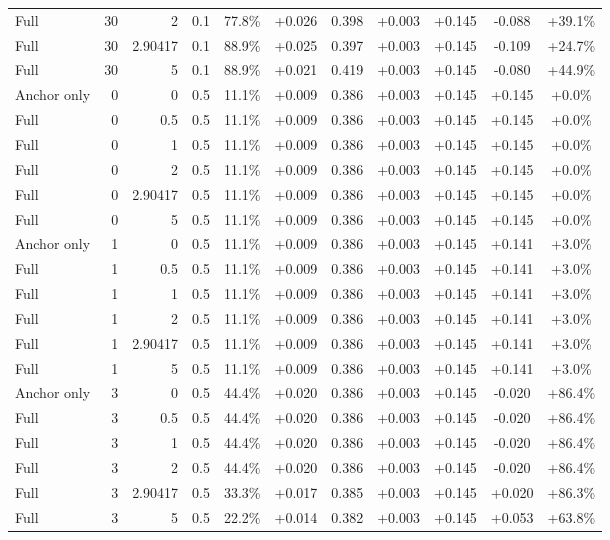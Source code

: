 \begin{table}[htbp]
\begin{tabular}{lrrrccccccc}
Full & 30 & 2 & 0.1 & 77.8\% & +0.026 & 0.398 & +0.003 & +0.145 & -0.088 & +39.1\% \\
Full & 30 & 2.90417 & 0.1 & 88.9\% & +0.025 & 0.397 & +0.003 & +0.145 & -0.109 & +24.7\% \\
Full & 30 & 5 & 0.1 & 88.9\% & +0.021 & 0.419 & +0.003 & +0.145 & -0.080 & +44.9\% \\
Anchor only & 0 & 0 & 0.5 & 11.1\% & +0.009 & 0.386 & +0.003 & +0.145 & +0.145 & +0.0\% \\
Full & 0 & 0.5 & 0.5 & 11.1\% & +0.009 & 0.386 & +0.003 & +0.145 & +0.145 & +0.0\% \\
Full & 0 & 1 & 0.5 & 11.1\% & +0.009 & 0.386 & +0.003 & +0.145 & +0.145 & +0.0\% \\
Full & 0 & 2 & 0.5 & 11.1\% & +0.009 & 0.386 & +0.003 & +0.145 & +0.145 & +0.0\% \\
Full & 0 & 2.90417 & 0.5 & 11.1\% & +0.009 & 0.386 & +0.003 & +0.145 & +0.145 & +0.0\% \\
Full & 0 & 5 & 0.5 & 11.1\% & +0.009 & 0.386 & +0.003 & +0.145 & +0.145 & +0.0\% \\
Anchor only & 1 & 0 & 0.5 & 11.1\% & +0.009 & 0.386 & +0.003 & +0.145 & +0.141 & +3.0\% \\
Full & 1 & 0.5 & 0.5 & 11.1\% & +0.009 & 0.386 & +0.003 & +0.145 & +0.141 & +3.0\% \\
Full & 1 & 1 & 0.5 & 11.1\% & +0.009 & 0.386 & +0.003 & +0.145 & +0.141 & +3.0\% \\
Full & 1 & 2 & 0.5 & 11.1\% & +0.009 & 0.386 & +0.003 & +0.145 & +0.141 & +3.0\% \\
Full & 1 & 2.90417 & 0.5 & 11.1\% & +0.009 & 0.386 & +0.003 & +0.145 & +0.141 & +3.0\% \\
Full & 1 & 5 & 0.5 & 11.1\% & +0.009 & 0.386 & +0.003 & +0.145 & +0.141 & +3.0\% \\
Anchor only & 3 & 0 & 0.5 & 44.4\% & +0.020 & 0.386 & +0.003 & +0.145 & -0.020 & +86.4\% \\
Full & 3 & 0.5 & 0.5 & 44.4\% & +0.020 & 0.386 & +0.003 & +0.145 & -0.020 & +86.4\% \\
Full & 3 & 1 & 0.5 & 44.4\% & +0.020 & 0.386 & +0.003 & +0.145 & -0.020 & +86.4\% \\
Full & 3 & 2 & 0.5 & 44.4\% & +0.020 & 0.386 & +0.003 & +0.145 & -0.020 & +86.4\% \\
Full & 3 & 2.90417 & 0.5 & 33.3\% & +0.017 & 0.385 & +0.003 & +0.145 & +0.020 & +86.3\% \\
Full & 3 & 5 & 0.5 & 22.2\% & +0.014 & 0.382 & +0.003 & +0.145 & +0.053 & +63.8\% \\

\end{tabular}
\end{table}
